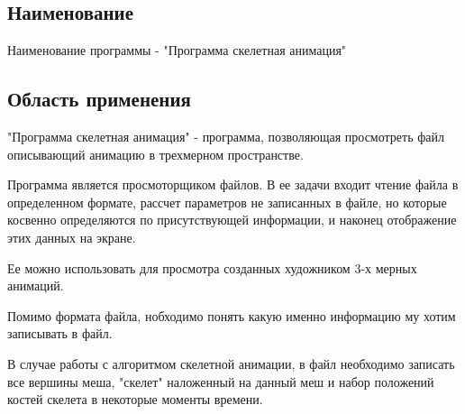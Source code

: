 \subsection{Наименование}
Наименование программы - "Программа скелетная анимация"

\subsection{Область применения}
"Программа скелетная анимация" - программа, позволяющая просмотреть файл описывающий анимацию в трехмерном пространстве. 

Программа является просмоторщиком файлов. В ее задачи входит чтение файла в определенном формате, рассчет параметров не записанных  в файле, но которые косвенно определяются по присутствующей информации, и наконец отображение этих данных на экране. 

Ее можно использовать для просмотра созданных художником 3-х мерных анимаций. 

Помимо формата файла, нобходимо понять какую именно информацию му хотим записывать в файл. 

В случае работы с алгоритмом скелетной анимации, в файл необходимо записать все вершины меша, "скелет" наложенный на данный меш и набор положений костей скелета в некоторые моменты времени.
